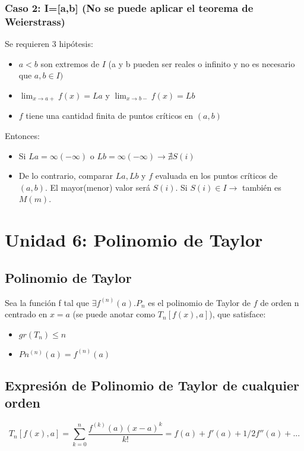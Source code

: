 \documentclass{report}
\begin{document}
		\subsection{Caso 2: I=[a,b] (No se puede aplicar el teorema de Weierstrass)}
			Se requieren 3 hipótesis:
			
			\begin{itemize}
				\item $a<b$ son extremos de $I$ (a y b pueden ser reales o infinito y no es necesario que $a,b\in I)$
				\item $\lim_{x \to a+}f(x)=La$ y $\lim_{x \to b-}f(x)=Lb$
				\item $f$ tiene una cantidad finita de puntos críticos en $(a,b)$
			\end{itemize}
		
			Entonces:
			
			\begin{itemize}
				\item Si $La=\infty(-\infty)$ o $Lb=\infty(-\infty) \rightarrow \nexists S(i)$
				\item De lo contrario, comparar $La,Lb$ y $f$ evaluada en los puntos críticos de $(a,b)$. El mayor(menor) valor será $S(i)$. Si $S(i) \in I \rightarrow$ también es $M(m)$. 
			\end{itemize}
		
\chapter{Unidad 6: Polinomio de Taylor}
	\section{Polinomio de Taylor}
		Sea la función f tal que $\exists f^{(n)}(a). P_n$ es el polinomio de Taylor de $f$ de orden n centrado en $x=a$ (se puede anotar como $T_n[f(x),a]$), que satisface:
	
	\begin{itemize}
		\item $gr(T_n)\leq n$
		\item $Pn^{(n)}(a)=f^{(n)}(a)$
	\end{itemize}

	\section{Expresión de Polinomio de Taylor de cualquier orden}
	
		$$T_n[f(x),a]=\sum_{k=0}^{n} \frac{f^{(k)}(a)(x-a)^k}{k!} = f(a)+f'(a)+1/2 f''(a)+...$$
		
\end{document}
